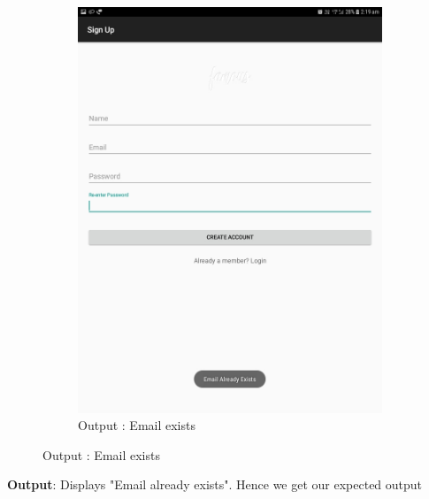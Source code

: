 \documentclass{scrreprt}
\begin{document}
\begin{itemize}
\begin{enumerate}
\begin{figure}[H]
\begin{subfigure}{0.5\textwidth}
\includegraphics[width=0.85\linewidth, keepaspectratio]{signupexistemailmes.jpg}
\caption{Output : Email exists}
\label{fig:subim2}
\end{subfigure}
\end{figure}
\textbf{Output}: Displays "Email already exists". Hence we get our expected output


\end{enumerate}
\end{itemize}
\end{document}
